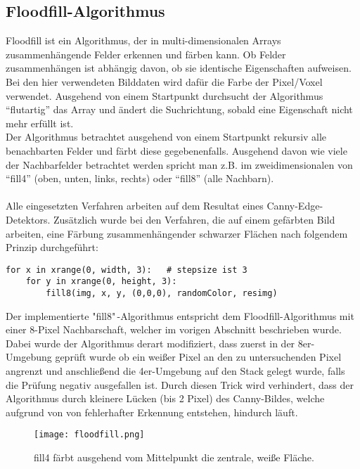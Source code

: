 	\subsection {Floodfill-Algorithmus}
Floodfill \cite{Andre2005} ist ein Algorithmus, der in multi-dimensionalen Arrays zusammenhängende Felder erkennen und färben kann. Ob Felder zusammenhängen ist abhängig davon, ob sie identische Eigenschaften aufweisen. Bei den hier verwendeten Bilddaten wird dafür die Farbe der Pixel/Voxel verwendet. Ausgehend von einem Startpunkt durchsucht der Algorithmus “flutartig” das Array und ändert die Suchrichtung, sobald eine Eigenschaft nicht mehr erfüllt ist. \\
Der Algorithmus betrachtet ausgehend von einem Startpunkt rekursiv alle benachbarten Felder und färbt diese gegebenenfalls. Ausgehend davon wie viele der Nachbarfelder betrachtet werden spricht man z.B. im zweidimensionalen von “fill4” (oben, unten, links, rechts) oder “fill8” (alle Nachbarn). \\ \\
Alle eingesetzten Verfahren arbeiten auf dem Resultat eines Canny-Edge-Detektors. Zusätzlich wurde bei den Verfahren, die auf einem gefärbten Bild arbeiten, eine Färbung zusammenhängender schwarzer Flächen nach folgendem Prinzip durchgeführt: \\

\begin{lstlisting}
for x in xrange(0, width, 3):   # stepsize ist 3
	for y in xrange(0, height, 3):
		fill8(img, x, y, (0,0,0), randomColor, resimg)
\end{lstlisting}

Der implementierte "fill8"\,-Algorithmus entspricht dem Floodfill-Algorithmus mit einer 8-Pixel Nachbarschaft, welcher im vorigen Abschnitt beschrieben wurde. Dabei wurde der Algorithmus derart modifiziert, dass zuerst in der 8er-Umgebung geprüft wurde ob ein weißer Pixel an den zu untersuchenden Pixel angrenzt und anschließend die 4er-Umgebung auf den Stack gelegt wurde, falls die Prüfung negativ ausgefallen ist. Durch diesen Trick wird verhindert, dass der Algorithmus durch kleinere Lücken (bis 2 Pixel) des Canny-Bildes, welche aufgrund von von fehlerhafter Erkennung entstehen, hindurch läuft.

\begin{figure}[H]
  \begin{center}
    \texttt{[image: floodfill.png]}
    \caption{fill4 färbt ausgehend vom Mittelpunkt die zentrale, weiße Fläche.}
    \label{fig:floodfill}
  \end{center}
\end{figure}

